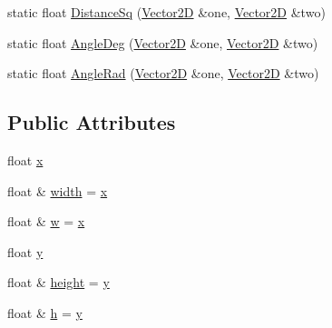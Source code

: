 \begin{DoxyCompactItemize}
\item 
static float \hyperlink{class_vector2_d_ad76081cba5229267c50aeb3e92ca1f1c}{Distance\+Sq} (\hyperlink{class_vector2_d}{Vector2D} \&one, \hyperlink{class_vector2_d}{Vector2D} \&two)
\item 
static float \hyperlink{class_vector2_d_aa406360b37523a1ddae7685330a1f53e}{Angle\+Deg} (\hyperlink{class_vector2_d}{Vector2D} \&one, \hyperlink{class_vector2_d}{Vector2D} \&two)
\item 
static float \hyperlink{class_vector2_d_a9d109b3c593fd52b42014c85149c9fe5}{Angle\+Rad} (\hyperlink{class_vector2_d}{Vector2D} \&one, \hyperlink{class_vector2_d}{Vector2D} \&two)
\end{DoxyCompactItemize}
\subsection*{Public Attributes}
\begin{DoxyCompactItemize}
\item 
float \hyperlink{class_vector2_d_aeb4253ba6555251d010ea4450619029e}{x}
\item 
float \& \hyperlink{class_vector2_d_a849dfb5d61bc6500e259011f512188e3}{width} = \hyperlink{class_vector2_d_aeb4253ba6555251d010ea4450619029e}{x}
\item 
float \& \hyperlink{class_vector2_d_a855db1822aebf50dd1521a1a550a30b8}{w} = \hyperlink{class_vector2_d_aeb4253ba6555251d010ea4450619029e}{x}
\item 
float \hyperlink{class_vector2_d_a85215519d3f71d0e6be7d636346f3b7d}{y}
\item 
float \& \hyperlink{class_vector2_d_a725dfed5745aa8176cd39ae334536bae}{height} = \hyperlink{class_vector2_d_a85215519d3f71d0e6be7d636346f3b7d}{y}
\item 
float \& \hyperlink{class_vector2_d_a8de2b56d13d0f0a7f9357dc42eef731e}{h} = \hyperlink{class_vector2_d_a85215519d3f71d0e6be7d636346f3b7d}{y}
\end{DoxyCompactItemize}
